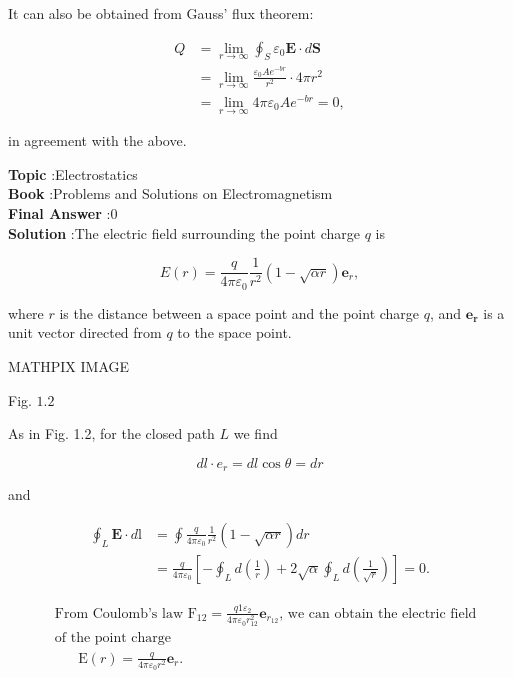 \documentclass[10pt]{article}
\begin{document}
It can also be obtained from Gauss' flux theorem:

$$
\begin{aligned}
Q &=\lim _{r \rightarrow \infty} \oint_{S} \varepsilon_{0} \mathbf{E} \cdot d \mathbf{S} \\
&=\lim _{r \rightarrow \infty} \frac{\varepsilon_{0} A e^{-b r}}{r^{2}} \cdot 4 \pi r^{2} \\
&=\lim _{r \rightarrow \infty} 4 \pi \varepsilon_{0} A e^{-b r}=0,
\end{aligned}
$$

in agreement with the above. 

\textbf{Topic} :Electrostatics\\
\textbf{Book} :Problems and Solutions on Electromagnetism\\
\textbf{Final Answer} :0\\


\textbf{Solution} :The electric field surrounding the point charge $q$ is

$$
E(r)=\frac{q}{4 \pi \varepsilon_{0}} \frac{1}{r^{2}}(1-\sqrt{\alpha r}) \mathbf{e}_{r},
$$

where $r$ is the distance between a space point and the point charge $q$, and $\mathbf{e}_{\boldsymbol{r}}$ is a unit vector directed from $q$ to the space point.

MATHPIX IMAGE

Fig. $1.2$

 As in Fig. 1.2, for the closed path $L$ we find

$$
d l \cdot e_{r}=d l \cos \theta=d r
$$

and

$$
\begin{aligned}
\oint_{L} \mathbf{E} \cdot d \mathrm{l} &=\oint \frac{q}{4 \pi \varepsilon_{0}} \frac{1}{r^{2}}(1-\sqrt{\alpha r}) d r \\
&=\frac{q}{4 \pi \varepsilon_{0}}\left[-\oint_{L} d\left(\frac{1}{r}\right)+2 \sqrt{\alpha} \oint_{L} d\left(\frac{1}{\sqrt{r}}\right)\right]=0 .
\end{aligned}
$$

$$
\begin{aligned}
&\text { From Coulomb's law } \mathrm{F}_{12}=\frac{q 1 \varepsilon_{2}}{4 \pi \varepsilon_{0} r_{12}^{2}} \mathbf{e}_{r_{12}} \text {, we can obtain the electric field } \\
&\text { of the point charge } \\
&\qquad \mathrm{E}(r)=\frac{q}{4 \pi \varepsilon_{0} r^{2}} \mathbf{e}_{r} .
\end{aligned}
$$
\end{document}
